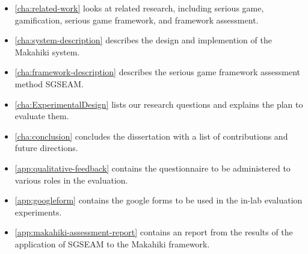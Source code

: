 \begin{itemize}
	\item \autoref{cha:related-work} looks at related research, including serious game, gamification, serious game framework, and framework assessment.
	\item \autoref{cha:system-description} describes the design and implemention of the Makahiki system.
    \item \autoref{cha:framework-description} describes the serious game framework assessment method SGSEAM.
	\item \autoref{cha:ExperimentalDesign} lists our research questions and explains the plan to evaluate them.
	\item \autoref{cha:conclusion} concludes the dissertation with a list of contributions and future directions.
	\item \autoref{app:qualitative-feedback} contains the questionnaire to be administered to various roles in the evaluation.
    \item \autoref{app:googleform} contains the google forms to be used in the in-lab evaluation experiments.
    \item \autoref{app:makahiki-assessment-report} contains an report from the results of the application of SGSEAM to the Makahiki framework.
\end{itemize}
